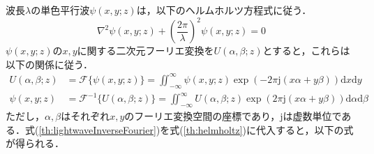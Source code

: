 波長$\lambda$の単色平行波$\psi(x,y;z)$は，以下のヘルムホルツ方程式に従う．
\begin{equation}
    \label{th:helmholtz}
    \nabla^2 \psi(x,y;z) + \left(\frac{2\pi}{\lambda} \right)^2 \psi(x,y;z) = 0
\end{equation}
$\psi(x,y;z)$の$x,y$に関する二次元フーリエ変換を$U(\alpha,\beta;z)$とすると，これらは以下の関係に従う．
\begin{align}
    \label{th:lightwaveFourier}
    U(\alpha,\beta;z) &= \mathcal{F}\{\psi(x,y;z)\} = \iint_{-\infty}^{\infty} \psi(x,y;z) \exp{\left(-2\pi \mathrm{j} (x\alpha + y\beta)\right)} \mathrm{d}x\mathrm{d}y \\
    \label{th:lightwaveInverseFourier}
    \psi(x,y;z) &= \mathcal{F}^{-1}\{U(\alpha,\beta;z)\} = \iint_{-\infty}^{\infty} U(\alpha,\beta;z) \exp{\left(2\pi \mathrm{j} (x\alpha + y\beta)\right)} \mathrm{d}\alpha\mathrm{d}\beta
\end{align}
ただし，$\alpha,\beta$はそれぞれ$x,y$のフーリエ変換空間の座標であり，$\mathrm{j}$は虚数単位である．式(\ref{th:lightwaveInverseFourier})を式(\ref{th:helmholtz})に代入すると，以下の式が得られる．

